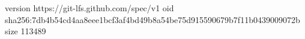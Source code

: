 version https://git-lfs.github.com/spec/v1
oid sha256:7db4b54cd4aa8eee1bcf3af4bd49b8a54be75d915590679b7f11b0439009072b
size 113489
